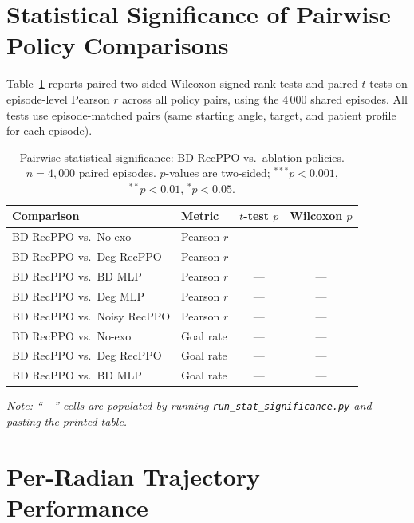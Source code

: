 \documentclass[letterpaper]{article} %
\begin{document}
\section{Statistical Significance of Pairwise Policy Comparisons}
\label{app:stats}

Table~\ref{tab:app_stats} reports paired two-sided Wilcoxon signed-rank tests
and paired $t$-tests on episode-level Pearson $r$ across all policy pairs,
using the 4\,000 shared episodes.
All tests use episode-matched pairs (same starting angle, target, and patient
profile for each episode).

\begin{table}[tbp]
  \centering
  \caption{Pairwise statistical significance: BD RecPPO vs.\ ablation policies.
    $n{=}4{,}000$ paired episodes.
    $p$-values are two-sided; $^{***}p{<}0.001$, $^{**}p{<}0.01$, $^{*}p{<}0.05$.}
  \label{tab:app_stats}
  \small
  \begin{tabular}{llcc}
    \toprule
    \textbf{Comparison} & \textbf{Metric}
      & \textbf{$t$-test $p$} & \textbf{Wilcoxon $p$} \\
    \midrule
    BD RecPPO vs.\ No-exo        & Pearson $r$ & — & — \\
    BD RecPPO vs.\ Deg RecPPO    & Pearson $r$ & — & — \\
    BD RecPPO vs.\ BD MLP        & Pearson $r$ & — & — \\
    BD RecPPO vs.\ Deg MLP       & Pearson $r$ & — & — \\
    BD RecPPO vs.\ Noisy RecPPO  & Pearson $r$ & — & — \\
    \midrule
    BD RecPPO vs.\ No-exo        & Goal rate   & — & — \\
    BD RecPPO vs.\ Deg RecPPO    & Goal rate   & — & — \\
    BD RecPPO vs.\ BD MLP        & Goal rate   & — & — \\
    \bottomrule
  \end{tabular}
  \vspace{0.4em}

  \small\textit{Note: ``—'' cells are populated by running
  \texttt{run\_stat\_significance.py} and pasting the printed table.}
\end{table}

\section{Per-Radian Trajectory Performance}
\label{app:radian}
\end{document}
